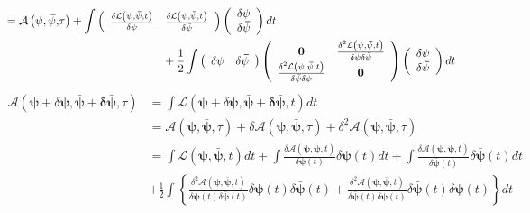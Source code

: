 \documentclass[aps,preprint]{revtex4}%
\begin{document}
\begin{align}
&  =\mathcal{A}\left(  \mathbf{\psi},\mathbf{\bar{\psi},}\tau\right)
+\int\left(
\begin{array}
[c]{cc}%
\frac{\delta\mathcal{L}\left(  \mathbf{\psi},\mathbf{\bar{\psi},}t\right)
}{\delta\psi} & \frac{\delta\mathcal{L}\left(  \mathbf{\psi},\mathbf{\bar
{\psi},}t\right)  }{\delta\bar{\psi}}%
\end{array}
\right)  \left(
\begin{array}
[c]{c}%
\delta\mathbf{\psi}\\
\delta\mathbf{\bar{\psi}}%
\end{array}
\right)  dt\\
&  \qquad\qquad\qquad\qquad\qquad\qquad\qquad+\frac{1}{2}\int\left(
\begin{array}
[c]{cc}%
\delta\mathbf{\psi} & \delta\mathbf{\bar{\psi}}%
\end{array}
\right)  \left(
\begin{array}
[c]{cc}%
\mathbf{0} & \frac{\delta^{2}\mathcal{L}\left(  \mathbf{\psi},\mathbf{\bar
{\psi},}t\right)  }{\delta\psi\delta\bar{\psi}}\\
\frac{\delta^{2}\mathcal{L}\left(  \mathbf{\psi},\mathbf{\bar{\psi},}t\right)
}{\delta\bar{\psi}\delta\psi} & \mathbf{0}%
\end{array}
\right)  \left(
\begin{array}
[c]{c}%
\delta\mathbf{\psi}\\
\delta\mathbf{\bar{\psi}}%
\end{array}
\right)  dt
\end{align}%
\begin{align}
\mathcal{A}\left(  \mathbf{\psi+}\delta\mathbf{\psi},\mathbf{\bar{\psi}%
+\delta\bar{\psi},}\tau\right)   &  =\int\mathcal{L}\left(  \mathbf{\psi
+}\delta\mathbf{\psi},\mathbf{\bar{\psi}+\delta\bar{\psi},}t\right)
dt\nonumber\\
&  =\mathcal{A}\left(  \mathbf{\psi},\mathbf{\bar{\psi},}\tau\right)
+\delta\mathcal{A}\left(  \mathbf{\psi},\mathbf{\bar{\psi},}\tau\right)
+\delta^{2}\mathcal{A}\left(  \mathbf{\psi},\mathbf{\bar{\psi},}\tau\right)
\nonumber\\
&  =\int\mathcal{L}\left(  \mathbf{\psi},\mathbf{\bar{\psi},}t\right)
dt+\int\frac{\delta\mathcal{A}\left(  \mathbf{\psi},\mathbf{\bar{\psi}%
,}t\right)  }{\delta\mathbf{\psi}\left(  t\right)  }\delta\mathbf{\psi}\left(
t\right)  dt+\int\frac{\delta\mathcal{A}\left(  \mathbf{\psi},\mathbf{\bar
{\psi},}t\right)  }{\delta\mathbf{\bar{\psi}}\left(  t\right)  }%
\delta\mathbf{\bar{\psi}}\left(  t\right)  dt\nonumber\\
&  +\frac{1}{2}\int\left\{  \frac{\delta^{2}\mathcal{A}\left(  \mathbf{\psi
},\mathbf{\bar{\psi},}t\right)  }{\delta\mathbf{\psi}\left(  t\right)
\delta\mathbf{\bar{\psi}}\left(  t\right)  }\delta\mathbf{\psi}\left(
t\right)  \delta\mathbf{\bar{\psi}}\left(  t\right)  +\frac{\delta
^{2}\mathcal{A}\left(  \mathbf{\psi},\mathbf{\bar{\psi},}t\right)  }%
{\delta\mathbf{\bar{\psi}}\left(  t\right)  \delta\mathbf{\psi}\left(
t\right)  }\delta\mathbf{\bar{\psi}}\left(  t\right)  \delta\mathbf{\psi
}\left(  t\right)  \right\}  dt
\end{align}%
\end{document}

